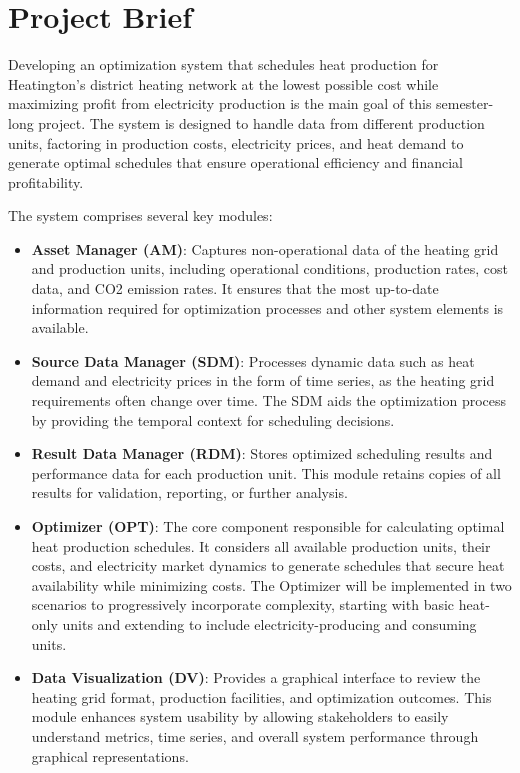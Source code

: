 \documentclass[12pt]{report}
\begin{document}
\section{Project Brief}
Developing an optimization system that schedules heat production for Heatington’s district heating network at the lowest possible cost while maximizing profit from electricity production is the main goal of this semester-long project. The system is designed to handle data from different production units, factoring in production costs, electricity prices, and heat demand to generate optimal schedules that ensure operational efficiency and financial profitability.

The system comprises several key modules:

\begin{itemize}
    \item \textbf{Asset Manager (AM)}: Captures non-operational data of the heating grid and production units, including operational conditions, production rates, cost data, and CO2 emission rates. It ensures that the most up-to-date information required for optimization processes and other system elements is available.
    \item \textbf{Source Data Manager (SDM)}: Processes dynamic data such as heat demand and electricity prices in the form of time series, as the heating grid requirements often change over time. The SDM aids the optimization process by providing the temporal context for scheduling decisions.
    \item \textbf{Result Data Manager (RDM)}: Stores optimized scheduling results and performance data for each production unit. This module retains copies of all results for validation, reporting, or further analysis.
    \item \textbf{Optimizer (OPT)}: The core component responsible for calculating optimal heat production schedules. It considers all available production units, their costs, and electricity market dynamics to generate schedules that secure heat availability while minimizing costs. The Optimizer will be implemented in two scenarios to progressively incorporate complexity, starting with basic heat-only units and extending to include electricity-producing and consuming units.
    \item \textbf{Data Visualization (DV)}: Provides a graphical interface to review the heating grid format, production facilities, and optimization outcomes. This module enhances system usability by allowing stakeholders to easily understand metrics, time series, and overall system performance through graphical representations.
\end{itemize}
\end{document}
